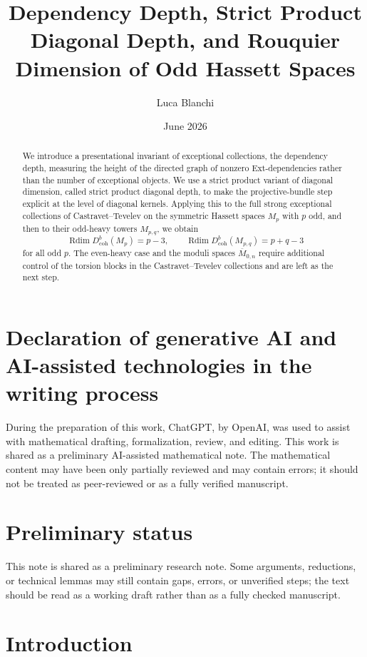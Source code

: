 \documentclass[11pt]{amsart}
\numberwithin{equation}{section}
\theoremstyle{definition}
\DeclareMathOperator{\Rdim}{Rdim}
\newcommand{\Db}{D^b_{\mathrm{coh}}}
\begin{document}
\title[Dependency depth and odd Hassett spaces]{Dependency Depth, Strict Product Diagonal Depth, and Rouquier Dimension of Odd Hassett Spaces}
\author{Luca Blanchi}
\date{June 2026}
\begin{abstract}
We introduce a presentational invariant of exceptional collections, the dependency depth, measuring the height of the directed graph of nonzero Ext-dependencies rather than the number of exceptional objects. We use a strict product variant of diagonal dimension, called strict product diagonal depth, to make the projective-bundle step explicit at the level of diagonal kernels. Applying this to the full strong exceptional collections of Castravet--Tevelev on the symmetric Hassett spaces $M_p$ with $p$ odd, and then to their odd-heavy towers $M_{p,q}$, we obtain
\[
\Rdim \Db(M_p)=p-3,
\qquad
\Rdim \Db(M_{p,q})=p+q-3
\]
for all odd $p$. The even-heavy case and the moduli spaces $\overline M_{0,n}$ require additional control of the torsion blocks in the Castravet--Tevelev collections and are left as the next step.
\end{abstract}
\maketitle

\section*{Declaration of generative AI and AI-assisted technologies in the writing process}
During the preparation of this work, ChatGPT, by OpenAI, was used to assist with mathematical drafting, formalization, review, and editing. This work is shared as a preliminary AI-assisted mathematical note. The mathematical content may have been only partially reviewed and may contain errors; it should not be treated as peer-reviewed or as a fully verified manuscript.

\section*{Preliminary status}
This note is shared as a preliminary research note. Some arguments, reductions, or technical lemmas may still contain gaps, errors, or unverified steps; the text should be read as a working draft rather than as a fully checked manuscript.

\section{Introduction}
\end{document}

